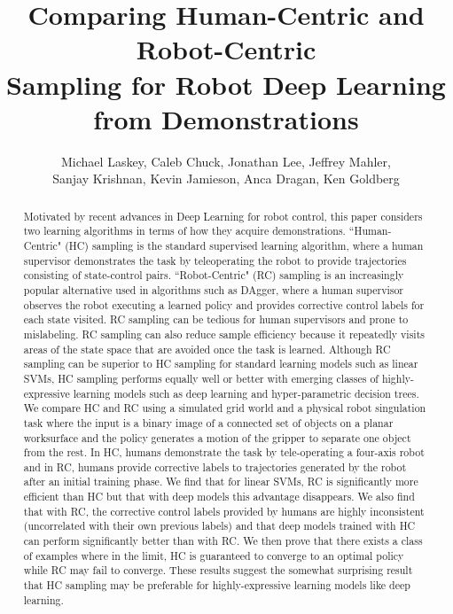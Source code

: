\documentclass[10pt, conference]{ieeeconf}      %
\title{Comparing Human-Centric and Robot-Centric \\
Sampling for Robot Deep Learning from Demonstrations}
\author{Michael Laskey, Caleb Chuck, Jonathan Lee, Jeffrey Mahler,\\ Sanjay Krishnan, Kevin Jamieson, Anca Dragan, Ken Goldberg}
\begin{document}
\maketitle
\thispagestyle{empty}
\pagestyle{empty}







\begin{abstract}
Motivated by recent advances in Deep Learning for robot control, this paper considers two learning algorithms in terms of how they acquire demonstrations. ``Human-Centric" (HC) sampling is the standard supervised learning algorithm, where a human supervisor demonstrates the task by teleoperating the robot to provide trajectories consisting of state-control pairs.  ``Robot-Centric" (RC) sampling is an increasingly popular alternative used in algorithms such as DAgger, where a human supervisor observes the robot executing a learned policy and provides corrective control labels for each state visited.  RC sampling can be tedious for human supervisors and prone to mislabeling.  RC sampling can also reduce sample efficiency because it repeatedly visits areas of the state space that are avoided once the task is learned. Although RC sampling can be superior to HC sampling for standard learning models such as linear SVMs, HC sampling performs equally well or better with emerging classes of highly-expressive learning models such as deep learning and hyper-parametric decision trees.  We compare HC and RC using a simulated grid world and a physical robot singulation task where the input is a binary image of a connected set of objects on a planar worksurface and the policy generates a motion of the gripper to separate one object from the rest.  In HC, humans demonstrate the task by tele-operating a four-axis robot and in RC, humans provide corrective labels to trajectories generated by the robot after an initial training phase.  We find that for linear SVMs, RC is significantly more efficient than HC but that with deep models this advantage disappears.  We also find that with RC, the corrective control labels provided by humans are highly inconsistent (uncorrelated with their own previous labels) and that deep models trained with HC can perform significantly better than with RC.  We then prove that there exists a class of examples where in the limit, HC is guaranteed to converge to an optimal policy while RC may fail to converge. These results suggest the somewhat surprising result that HC sampling may be preferable for highly-expressive learning models like deep learning.
 \end{abstract}
\end{document}
